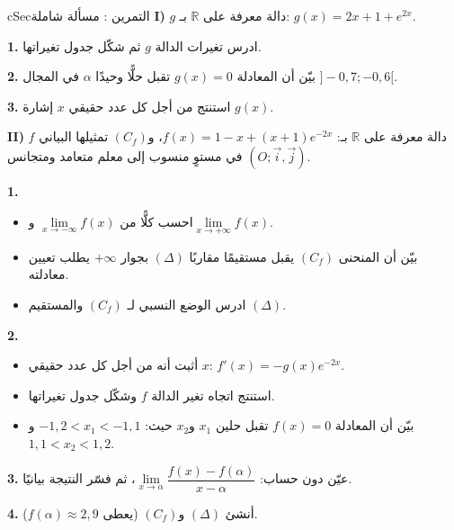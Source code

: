 \documentclass[12pt,a4paper]{article}
\newenvironment{BOX}[2]{\begin{otherlanguage}{english}\begin{arbox}{#1}{#2}}{\end{arbox}\end{otherlanguage}}
\newcounter{exo}
\newenvironment{tamrin}[1]{\stepcounter{exo}\begin{BOX}{cSec}{التمرين \theexo: #1}}{\end{BOX}}
\newcommand{\R}{\mathbb{R}}
\newenvironment{sq}{\begin{itemize}[leftmargin=2.4em,itemsep=3pt]}{\end{itemize}}
\newcommand{\qa}{\item[(أ)]}\newcommand{\qb}{\item[(ب)]}\newcommand{\qc}{\item[(جـ)]}\newcommand{\qd}{\item[(د)]}\newcommand{\qe}{\item[(هـ)]}
\newcommand{\QQ}[1]{\par\smallskip\textbf{#1.} }
\begin{document}
\begin{tamrin}{مسألة شاملة}
\textbf{I)} $g$ دالة معرفة على $\R$ بـ: $g(x)=2x+1+e^{2x}$.
\QQ{1} ادرس تغيرات الدالة $g$ ثم شكّل جدول تغيراتها.
\QQ{2} بيّن أن المعادلة $g(x)=0$ تقبل حلًّا وحيدًا $\alpha$ في المجال $]-0{,}7;-0{,}6[$.
\QQ{3} استنتج من أجل كل عدد حقيقي $x$ إشارة $g(x)$.

\textbf{II)} $f$ دالة معرفة على $\R$ بـ: $f(x)=1-x+(x+1)e^{-2x}$، و$(C_f)$ تمثيلها البياني في مستوٍ منسوب إلى معلم متعامد ومتجانس $(O;\vec i,\vec j)$.
\QQ{1}
\begin{sq}
\qa احسب كلًّا من $\lim\limits_{x\to-\infty}f(x)$ و$\lim\limits_{x\to+\infty}f(x)$.
\qb بيّن أن المنحنى $(C_f)$ يقبل مستقيمًا مقاربًا $(\Delta)$ بجوار $+\infty$ يطلب تعيين معادلته.
\qc ادرس الوضع النسبي لـ $(C_f)$ والمستقيم $(\Delta)$.
\end{sq}
\QQ{2}
\begin{sq}
\qa أثبت أنه من أجل كل عدد حقيقي $x$: $f'(x)=-g(x)e^{-2x}$.
\qb استنتج اتجاه تغير الدالة $f$ وشكّل جدول تغيراتها.
\qc بيّن أن المعادلة $f(x)=0$ تقبل حلين $x_1$ و$x_2$ حيث: $-1{,}2<x_1<-1{,}1$ و$1{,}1<x_2<1{,}2$.
\end{sq}
\QQ{3} عيّن دون حساب: $\lim\limits_{x\to\alpha}\dfrac{f(x)-f(\alpha)}{x-\alpha}$، ثم فسّر النتيجة بيانيًا.
\QQ{4} أنشئ $(\Delta)$ و$(C_f)$ (يعطى $f(\alpha)\approx2{,}9$).
\end{tamrin}
\end{document}
